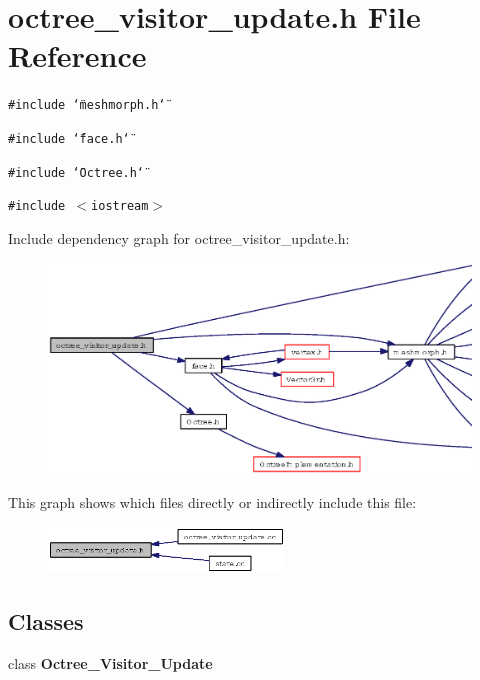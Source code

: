 \section{octree\_\-visitor\_\-update.h File Reference}
\label{octree__visitor__update_8h}
{\tt \#include \char`\"{}meshmorph.h\char`\"{}}\par
{\tt \#include \char`\"{}face.h\char`\"{}}\par
{\tt \#include \char`\"{}Octree.h\char`\"{}}\par
{\tt \#include $<$iostream$>$}\par


Include dependency graph for octree\_\-visitor\_\-update.h:\begin{figure}[H]
\begin{center}
\leavevmode
\includegraphics[width=350pt]{octree__visitor__update_8h__incl}
\end{center}
\end{figure}


This graph shows which files directly or indirectly include this file:\begin{figure}[H]
\begin{center}
\leavevmode
\includegraphics[width=178pt]{octree__visitor__update_8h__dep__incl}
\end{center}
\end{figure}
\subsection*{Classes}
\begin{CompactItemize}
\item 
class {\bf Octree\_\-Visitor\_\-Update}
\end{CompactItemize}
